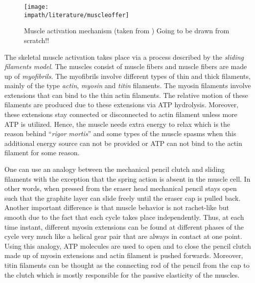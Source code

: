 %
\begin{figure}%
\centering
\texttt{[image: \\impath/literature/muscleoffer]}%
\caption[Muscle activation mechanism]{Muscle activation mechanism (taken from \cite{offer}) Going to be drawn from scratch!!}%
\label{fig:lit:muscle}%
\end{figure}

The skeletal muscle activation takes place via a process described by the \emph{sliding filaments model}. The muscles 
consist of muscle fibers and muscle fibers are made up of \emph{myofibrils}. The myofibrils involve different types of thin 
and thick filaments, mainly of the type \emph{actin}, \emph{myosin} and \emph{titin} filaments. The myosin filaments involve 
extensions that can bind to the thin actin filaments. The relative motion of these filaments are produced due to these 
extensions via ATP hydrolysis. Moreover, these extensions stay connected or disconnected to actin filament unless more 
ATP is utilized. Hence, the muscle needs extra energy to relax which is the reason behind \enquote{\emph{rigor mortis}} 
and some types of the muscle spasms when this additional energy source can not be provided or ATP can not bind to the 
actin filament for some reason. 


One can use an analogy between the mechanical pencil clutch and sliding filaments with the exception that the spring action 
is absent in the muscle cell. In other words, when 
pressed from the eraser head mechanical pencil stays open such that the graphite layer can slide freely until the eraser 
cap is pulled back. Another important difference is that muscle behavior is not rachet-like but smooth due to the fact 
that each cycle takes place independently. Thus, at each time instant, different myosin extensions can be found at 
different phases of the cycle very much like a helical gear pair that are always in contact at one point. Using this 
analogy, ATP molecules are used to open and to close the pencil clutch made up of myosin extensions and actin filament 
is pushed forwards. Moreover, titin filaments can be thought as the connecting rod of the pencil from the cap to the clutch 
which is mostly responsible for the passive elasticity of the muscles. 



